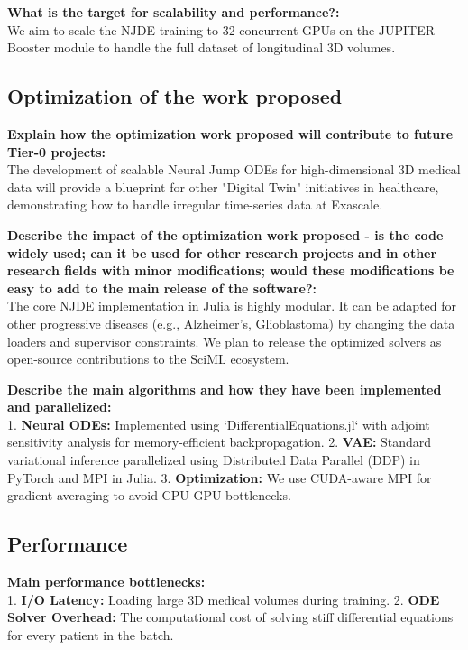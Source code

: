 \documentclass[11pt, a4paper]{article}
\begin{document}
\vspace{0.5em}
\noindent\textbf{What is the target for scalability and performance?:} \\
We aim to scale the NJDE training to 32 concurrent GPUs on the JUPITER Booster module to handle the full dataset of longitudinal 3D volumes.

\subsection*{Optimization of the work proposed}

\noindent\textbf{Explain how the optimization work proposed will contribute to future Tier-0 projects:} \\
The development of scalable Neural Jump ODEs for high-dimensional 3D medical data will provide a blueprint for other "Digital Twin" initiatives in healthcare, demonstrating how to handle irregular time-series data at Exascale.

\vspace{0.5em}
\noindent\textbf{Describe the impact of the optimization work proposed - is the code widely used; can it be used for other research projects and in other research fields with minor modifications; would these modifications be easy to add to the main release of the software?:} \\
The core NJDE implementation in Julia is highly modular. It can be adapted for other progressive diseases (e.g., Alzheimer's, Glioblastoma) by changing the data loaders and supervisor constraints. We plan to release the optimized solvers as open-source contributions to the SciML ecosystem.

\vspace{0.5em}
\noindent\textbf{Describe the main algorithms and how they have been implemented and parallelized:} \\
1. \textbf{Neural ODEs:} Implemented using `DifferentialEquations.jl` with adjoint sensitivity analysis for memory-efficient backpropagation.
2. \textbf{VAE:} Standard variational inference parallelized using Distributed Data Parallel (DDP) in PyTorch and MPI in Julia.
3. \textbf{Optimization:} We use CUDA-aware MPI for gradient averaging to avoid CPU-GPU bottlenecks.

\subsection*{Performance}

\noindent\textbf{Main performance bottlenecks:} \\
1. \textbf{I/O Latency:} Loading large 3D medical volumes during training.
2. \textbf{ODE Solver Overhead:} The computational cost of solving stiff differential equations for every patient in the batch.
\end{document}
